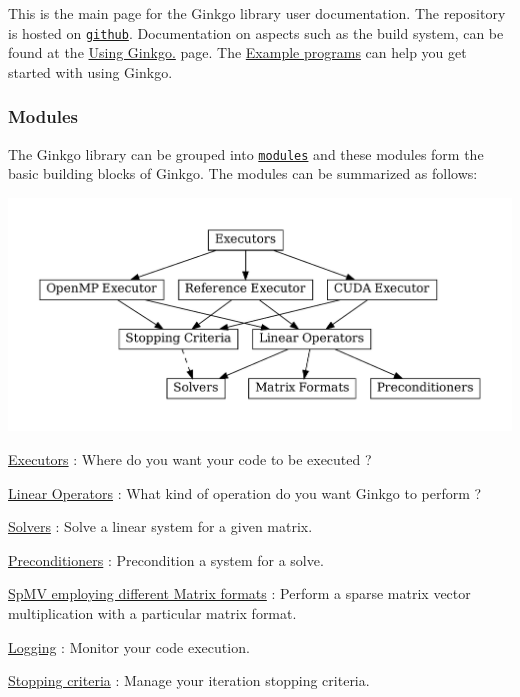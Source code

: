 This is the main page for the Ginkgo library user documentation. The repository is hosted on \href{https://github.com/ginkgo-project/ginkgo}{\tt github}. Documentation on aspects such as the build system, can be found at the \hyperlink{using_ginkgo}{Using Ginkgo.} page. The \hyperlink{Examples}{Example programs} can help you get started with using Ginkgo.

\subsubsection*{Modules}

The Ginkgo library can be grouped into \href{modules.html}{\tt modules} and these modules form the basic building blocks of Ginkgo. The modules can be summarized as follows\+:


\begin{DoxyImageNoCaption}
  \mbox{\includegraphics[width=\textwidth,height=\textheight/2,keepaspectratio=true]{dot_modules}}
\end{DoxyImageNoCaption}



\begin{DoxyItemize}
\item \hyperlink{group__Executor}{Executors} \+: Where do you want your code to be executed ?
\item \hyperlink{group__LinOp}{Linear Operators} \+: What kind of operation do you want Ginkgo to perform ?
\begin{DoxyItemize}
\item \hyperlink{group__solvers}{Solvers} \+: Solve a linear system for a given matrix.
\item \hyperlink{group__precond}{Preconditioners} \+: Precondition a system for a solve.
\item \hyperlink{group__mat__formats}{Sp\+MV employing different Matrix formats} \+: Perform a sparse matrix vector multiplication with a particular matrix format.
\end{DoxyItemize}
\item \hyperlink{group__log}{Logging} \+: Monitor your code execution.
\item \hyperlink{group__stop}{Stopping criteria} \+: Manage your iteration stopping criteria. 
\end{DoxyItemize}